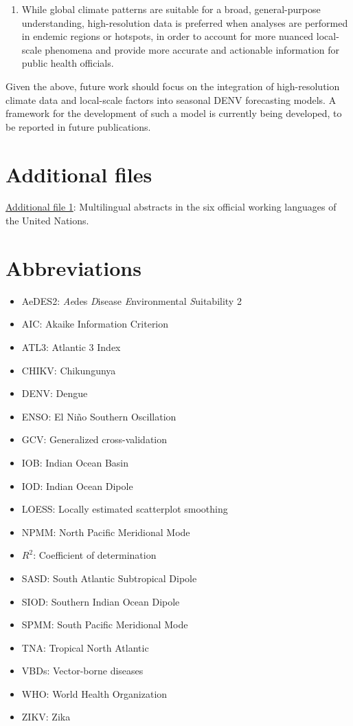 \documentclass[10pt,twocolumn]{wlscirep}
\begin{document}
\begin{enumerate}
  \item While global climate patterns are suitable for a broad, general-purpose understanding, high-resolution data is preferred when analyses are performed in endemic regions or hotspots, in order to account for more nuanced local-scale phenomena and provide more accurate and actionable information for public health officials.
\end{enumerate}

Given the above, future work should focus on the integration of high-resolution climate data and local-scale factors into seasonal DENV forecasting models. A framework for the development of such a model is currently being developed, to be reported in future publications.

\section{Additional files} \label{sec-additional-files}

\href{multilingual_abstracts.pdf}{Additional file 1}: Multilingual abstracts in the six official working languages of the United Nations.

\section{Abbreviations} \label{sec-abbreviations}
\begin{itemize}
  \item AeDES2: \textit{Ae}des \textit{D}isease \textit{E}nvironmental \textit{S}uitability 2
  \item AIC: Akaike Information Criterion
  \item ATL3: Atlantic 3 Index
  \item CHIKV: Chikungunya
  \item DENV: Dengue
  \item ENSO: El Niño Southern Oscillation
  \item GCV: Generalized cross-validation
  \item IOB: Indian Ocean Basin
  \item IOD: Indian Ocean Dipole
  \item LOESS: Locally estimated scatterplot smoothing
  \item NPMM: North Pacific Meridional Mode
  \item $R^2$: Coefficient of determination
  \item SASD: South Atlantic Subtropical Dipole
  \item SIOD: Southern Indian Ocean Dipole
  \item SPMM: South Pacific Meridional Mode
  \item TNA: Tropical North Atlantic
  \item VBDs: Vector-borne diseases
  \item WHO: World Health Organization
  \item ZIKV: Zika
\end{itemize}
\end{document}
